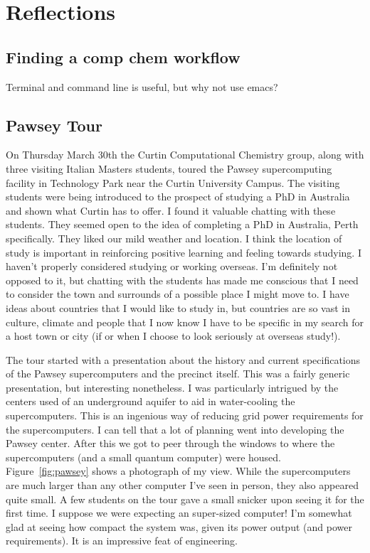 \documentclass[11pt]{article}
\begin{document}
\section{Reflections}

\subsection{Finding a comp chem workflow}

Terminal and command line is useful, but why not use emacs?

\subsection{Pawsey Tour}

On Thursday March 30th the Curtin Computational Chemistry group, along with three visiting Italian Masters students, toured the Pawsey supercomputing facility in Technology Park near the Curtin University Campus. The visiting students were being introduced to the prospect of studying a PhD in Australia and shown what Curtin has to offer. I found it valuable chatting with these students. They seemed open to the idea of completing a PhD in Australia, Perth specifically. They liked our mild weather and location. I think the location of study is important in reinforcing positive learning and feeling towards studying. I haven't properly considered studying or working overseas. I'm definitely not opposed to it, but chatting with the students has made me conscious that I need to consider the town and surrounds of a possible place I might move to. I have ideas about countries that I would like to study in, but countries are so vast in culture, climate and people that I now know I have to be specific in my search for a host town or city (if or when I choose to look seriously at overseas study!).

The tour started with a presentation about the history and current specifications of the Pawsey supercomputers and the precinct itself. This was a fairly generic presentation, but interesting nonetheless. I was particularly intrigued by the centers used of an underground aquifer to aid in water-cooling the supercomputers. This is an ingenious way of reducing grid power requirements for the supercomputers. I can tell that a lot of planning went into developing the Pawsey center. After this we got to peer through the windows to where the supercomputers (and a small quantum computer) were housed. Figure~\ref{fig:pawsey} shows a photograph of my view. While the supercomputers are much larger than any other computer I've seen in person, they also appeared quite small. A few students on the tour gave a small snicker upon seeing it for the first time. I suppose we were expecting an super-sized computer! I'm somewhat glad at seeing how compact the system was, given its power output (and power requirements). It is an impressive feat of engineering.
\end{document}
